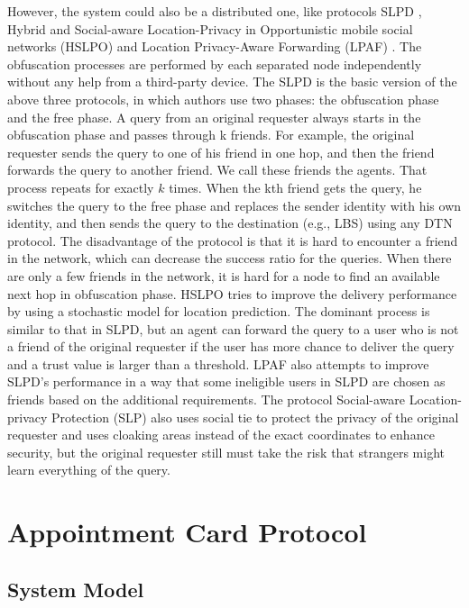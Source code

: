 \documentclass[conference]{IEEEtran}
\begin{document}
However, the system could also be a distributed one, like protocols SLPD \cite{C4}, Hybrid and Social-aware Location-Privacy in Opportunistic mobile social networks (HSLPO) \cite{C5} and Location Privacy-Aware Forwarding (LPAF) \cite{C6}. The obfuscation processes are performed by each separated node independently without any help from a third-party device. The SLPD is the basic version of the above three protocols, in which authors use two phases: the obfuscation phase and the free phase. A query from an original requester always starts in the obfuscation phase and passes through k friends. For example, the original requester sends the query to one of his friend in one hop, and then the friend forwards the query to another friend. We call these friends the agents. That process repeats for exactly $k$ times. When the kth friend gets the query, he switches the query to the free phase and replaces the sender identity with his own identity, and then sends the query to the destination (e.g., LBS) using any DTN protocol. The disadvantage of the protocol is that it is hard to encounter a friend in the network, which can decrease the success ratio for the queries. When there are only a few friends in the network, it is hard for a node to find an available next hop in obfuscation phase. HSLPO tries to improve the delivery performance by using a stochastic model for location prediction. The dominant process is similar to that in SLPD, but an agent can forward the query to a user who is not a friend of the original requester if the user has more chance to deliver the query and a trust value is larger than a threshold. LPAF also attempts to improve SLPD’s performance in a way that some ineligible users in SLPD are chosen as friends based on the additional requirements. The protocol Social-aware Location-privacy Protection (SLP) \cite{C20} also uses  social tie to protect the privacy of the original requester and uses cloaking areas instead of the exact coordinates to enhance security, but the original requester still must take the risk that strangers might learn everything of the query.

\section{Appointment Card Protocol} \label{AppCrdPrl}

\subsection{System Model}
\end{document}
